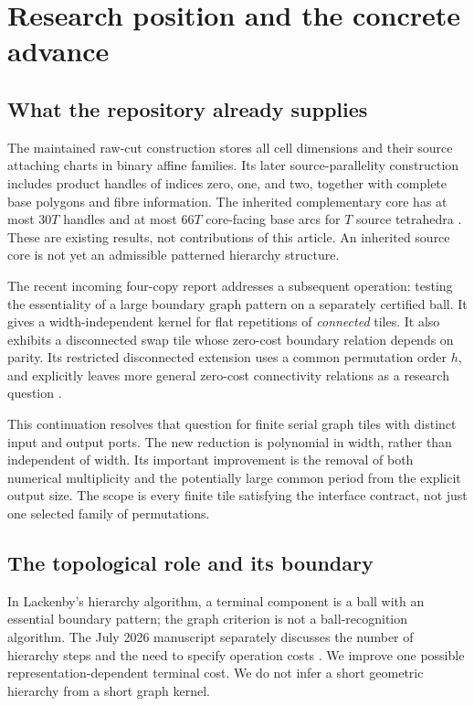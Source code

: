 \documentclass[11pt]{article}
\theoremstyle{remark}\newtheorem{remark}[theorem]{Remark}
\begin{document}
\section{Research position and the concrete advance}
\subsection{What the repository already supplies}
The maintained raw-cut construction stores all cell dimensions and their source attaching charts in binary affine families. Its later source-parallelity construction includes product handles of indices zero, one, and two, together with complete base polygons and fibre information. The inherited complementary core has at most $30T$ handles and at most $66T$ core-facing base arcs for $T$ source tetrahedra \cite{rawcut,parallelity}. These are existing results, not contributions of this article. An inherited source core is not yet an admissible patterned hierarchy structure.

The recent incoming four-copy report addresses a subsequent operation: testing the essentiality of a large boundary graph pattern on a separately certified ball. It gives a width-independent kernel for flat repetitions of \emph{connected} tiles. It also exhibits a disconnected swap tile whose zero-cost boundary relation depends on parity. Its restricted disconnected extension uses a common permutation order $h$, and explicitly leaves more general zero-cost connectivity relations as a research question \cite{fourcopy}.

This continuation resolves that question for finite serial graph tiles with distinct input and output ports. The new reduction is polynomial in width, rather than independent of width. Its important improvement is the removal of both numerical multiplicity and the potentially large common period from the explicit output size. The scope is every finite tile satisfying the interface contract, not just one selected family of permutations.

\subsection{The topological role and its boundary}
In Lackenby's hierarchy algorithm, a terminal component is a ball with an essential boundary pattern; the graph criterion is not a ball-recognition algorithm. The July 2026 manuscript separately discusses the number of hierarchy steps and the need to specify operation costs \cite{lackenby2026}. We improve one possible representation-dependent terminal cost. We do not infer a short geometric hierarchy from a short graph kernel.
\end{document}
